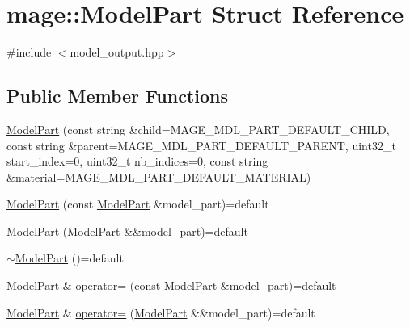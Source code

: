 \hypertarget{structmage_1_1_model_part}{}\section{mage\+:\+:Model\+Part Struct Reference}
\label{structmage_1_1_model_part}


{\ttfamily \#include $<$model\+\_\+output.\+hpp$>$}

\subsection*{Public Member Functions}
\begin{DoxyCompactItemize}
\item 
\hyperlink{structmage_1_1_model_part_a4a9443af884ad45625f894ae33eaac32}{Model\+Part} (const string \&child=M\+A\+G\+E\+\_\+\+M\+D\+L\+\_\+\+P\+A\+R\+T\+\_\+\+D\+E\+F\+A\+U\+L\+T\+\_\+\+C\+H\+I\+LD, const string \&parent=M\+A\+G\+E\+\_\+\+M\+D\+L\+\_\+\+P\+A\+R\+T\+\_\+\+D\+E\+F\+A\+U\+L\+T\+\_\+\+P\+A\+R\+E\+NT, uint32\+\_\+t start\+\_\+index=0, uint32\+\_\+t nb\+\_\+indices=0, const string \&material=M\+A\+G\+E\+\_\+\+M\+D\+L\+\_\+\+P\+A\+R\+T\+\_\+\+D\+E\+F\+A\+U\+L\+T\+\_\+\+M\+A\+T\+E\+R\+I\+AL)
\item 
\hyperlink{structmage_1_1_model_part_a3c39c2c312f07687f8ad5c2c2580d1e2}{Model\+Part} (const \hyperlink{structmage_1_1_model_part}{Model\+Part} \&model\+\_\+part)=default
\item 
\hyperlink{structmage_1_1_model_part_af8744793e9e6eccd59211c87ffc8e745}{Model\+Part} (\hyperlink{structmage_1_1_model_part}{Model\+Part} \&\&model\+\_\+part)=default
\item 
\hyperlink{structmage_1_1_model_part_a3322c5c7924ec30be170ae1ed6dca550}{$\sim$\+Model\+Part} ()=default
\item 
\hyperlink{structmage_1_1_model_part}{Model\+Part} \& \hyperlink{structmage_1_1_model_part_a37e9d66b701ed84111160bf5a003b658}{operator=} (const \hyperlink{structmage_1_1_model_part}{Model\+Part} \&model\+\_\+part)=default
\item 
\hyperlink{structmage_1_1_model_part}{Model\+Part} \& \hyperlink{structmage_1_1_model_part_a8337b8034d9a43514690a2db3d0f43c7}{operator=} (\hyperlink{structmage_1_1_model_part}{Model\+Part} \&\&model\+\_\+part)=default
\end{DoxyCompactItemize}
